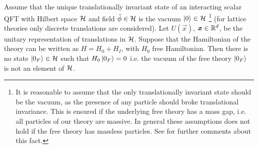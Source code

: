 \documentclass[../main/main.tex]{subfiles}
\begin{document}
\begin{theorem}[Haag]
	Assume that the unique translationally invariant state of an interacting scalar QFT with Hilbert space $\mathcal H$ and field $\hat{\phi}\in\mathcal H$ is the vacuum $\ket0\in\mathcal H$ \footnote{It is reasonable to assume that the only translationally invariant state should be the vacuum, as the presence of any particle should broke translational invariance. This is ensured if the underlying free theory has a mass gap, i.e. all particles of our theory are massive. In general these assumptions does not hold if the free theory has massless particles. See \cite[Section 3]{Earman:2005} for further comments about this fact.} (for lattice theories only discrete translations are considered).  Let $U(\vec x)$, $\boldsymbol x\in\mathbb{R}^d$, be the unitary representation of translations in $\mathcal H$. Suppose that the Hamiltonian of the theory can be written as $H=H_0+H_I$, with $H_0$ free Hamiltonian. Then there is no state $\ket{0_F}\in\mathcal H$ such that $H_0\ket{0_F}=0$ i.e. the vacuum of the free theory $\ket{0_F}$ is not an element of $\mathcal H$.
\end{theorem}
\end{document}
